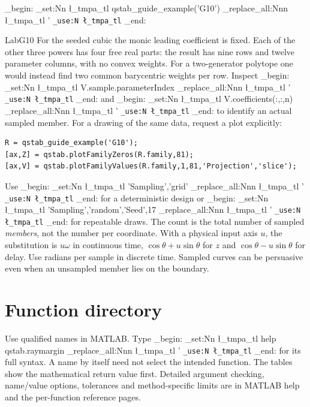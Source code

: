 \documentclass[11pt,a4paper]{article}
\newcommand{\m}[1]{
  \group_begin:
  \tl_set:Nn \l_tmpa_tl {#1}
  \tl_replace_all:Nnn \l_tmpa_tl {'}{\textquotesingle{}}
  \texttt{\tl_use:N \l_tmpa_tl}
  \group_end:
}
\newcommand{\lead}[1]{\par\smallskip\noindent{\sffamily\bfseries\color{teal}#1}\enspace}
\newcommand{\topic}[2]{\clearpage\section{#1}\label{#2}}
\newcommand{\lab}[1]{\lead{Executable example #1}\m{qstab\_guide\_example('#1')}\par\csname Lab#1\endcsname}
\begin{document}
\lab{G10}
For the seeded cubic the monic leading coefficient is fixed. Each of the other three powers has four free real parts: the result has nine rows and twelve parameter columns, with no convex weights. For a two-generator polytope one would instead find two common barycentric weights per row. Inspect \m{V.sample.parameterIndex} and \m{V.coefficients(:,:,n)} to identify an actual sampled member. For a drawing of the same data, request a plot explicitly:
\begin{lstlisting}
R = qstab_guide_example('G10');
[ax,Z] = qstab.plotFamilyZeros(R.family,81);
[ax,V] = qstab.plotFamilyValues(R.family,1,81,'Projection','slice');
\end{lstlisting}
Use \m{'Sampling','grid'} for a deterministic design or \m{'Sampling','random','Seed',17} for repeatable draws. The count is the total number of sampled \emph{members}, not the number per coordinate. With a physical input axis $u$, the substitution is $u\omega$ in continuous time, $\cos\theta+u\sin\theta$ for $z$ and $\cos\theta-u\sin\theta$ for delay. Use radians per sample in discrete time. Sampled curves can be persuasive even when an unsampled member lies on the boundary.
\topic{Function directory}{sec:directory}
Use qualified names in MATLAB. Type \m{help qstab.raymargin} for its full syntax. A name by itself need not select the intended function. The tables show the mathematical return value first. Detailed argument checking, name/value options, tolerances and method-specific limits are in MATLAB help and the per-function reference pages.
\end{document}
